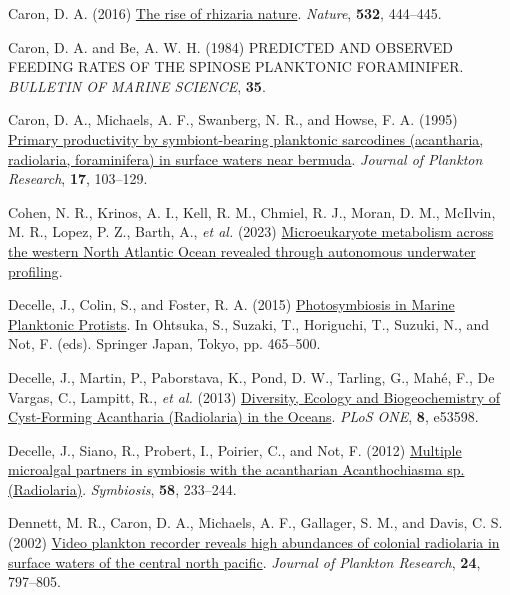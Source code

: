 \documentclass[
]{article}
\newlength{\cslhangindent}
\newlength{\cslentryspacingunit} %
\newenvironment{CSLReferences}[2] %
 {%
  \setlength{\parindent}{0pt}
  \ifodd #1
  \let\oldpar\par
  \def\par{\hangindent=\cslhangindent\oldpar}
  \fi
  \setlength{\parskip}{#2\cslentryspacingunit}
 }%
 {}
\begin{document}
\begin{CSLReferences}{1}{0}
\leavevmode{}%
Caron, D. A. (2016)
\href{https://www.nature.com/articles/nature17892}{The rise of rhizaria
\textbar{} nature}. \emph{Nature}, \textbf{532}, 444--445.

\leavevmode{}%
Caron, D. A. and Be, A. W. H. (1984) PREDICTED AND OBSERVED FEEDING
RATES OF THE SPINOSE PLANKTONIC FORAMINIFER. \emph{BULLETIN OF MARINE
SCIENCE}, \textbf{35}.

\leavevmode{}%
Caron, D. A., Michaels, A. F., Swanberg, N. R., and Howse, F. A. (1995)
\href{https://doi.org/10.1093/plankt/17.1.103}{Primary productivity by
symbiont-bearing planktonic sarcodines (acantharia, radiolaria,
foraminifera) in surface waters near bermuda}. \emph{Journal of Plankton
Research}, \textbf{17}, 103--129.

\leavevmode{}%
Cohen, N. R., Krinos, A. I., Kell, R. M., Chmiel, R. J., Moran, D. M.,
McIlvin, M. R., Lopez, P. Z., Barth, A., \emph{et al.} (2023)
\href{https://doi.org/10.1101/2023.11.20.567900}{Microeukaryote
metabolism across the western North Atlantic Ocean revealed through
autonomous underwater profiling}.

\leavevmode{}%
Decelle, J., Colin, S., and Foster, R. A. (2015)
\href{https://doi.org/10.1007/978-4-431-55130-0_19}{Photosymbiosis in
Marine Planktonic Protists}. In Ohtsuka, S., Suzaki, T., Horiguchi, T.,
Suzuki, N., and Not, F. (eds). Springer Japan, Tokyo, pp. 465--500.

\leavevmode{}%
Decelle, J., Martin, P., Paborstava, K., Pond, D. W., Tarling, G., Mahé,
F., De Vargas, C., Lampitt, R., \emph{et al.} (2013)
\href{https://doi.org/10.1371/journal.pone.0053598}{Diversity, Ecology
and Biogeochemistry of Cyst-Forming Acantharia (Radiolaria) in the
Oceans}. \emph{PLoS ONE}, \textbf{8}, e53598.

\leavevmode{}%
Decelle, J., Siano, R., Probert, I., Poirier, C., and Not, F. (2012)
\href{https://doi.org/10.1007/s13199-012-0195-x}{Multiple microalgal
partners in symbiosis with the acantharian Acanthochiasma sp.
(Radiolaria)}. \emph{Symbiosis}, \textbf{58}, 233--244.

\leavevmode{}%
Dennett, M. R., Caron, D. A., Michaels, A. F., Gallager, S. M., and
Davis, C. S. (2002) \href{https://doi.org/10.1093/plankt/24.8.797}{Video
plankton recorder reveals high abundances of colonial radiolaria in
surface waters of the central north pacific}. \emph{Journal of Plankton
Research}, \textbf{24}, 797--805.


\end{CSLReferences}
\end{document}
